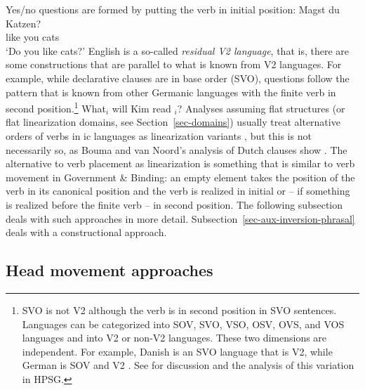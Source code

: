 \documentclass[output=paper
                ,modfonts
                ,nonflat
	        ,collection
	        ,collectionchapter
	        ,collectiontoclongg
 	        ,biblatex
                ,babelshorthands
                ,newtxmath
                ,draftmode
                ,colorlinks, citecolor=brown
]{./langsci/langscibook}
\begin{document}
Yes/no questions are formed by putting the verb in initial position:
\ea
\gll Magst du Katzen?\\
     like  you cats\\
\glt `Do you like cats?'
\z
English is a so-called \emph{residual V2 language}, that is, there are
some constructions that are parallel to what is known from V2 languages.
For example, while declarative clauses are in base order (SVO), questions follow the pattern that is
known from other Germanic languages with the finite verb in second position.\footnote{%
  SVO is not V2 although the verb is in second position in SVO sentences. Languages can be
  categorized into SOV, SVO, VSO, OSV, OVS, and VOS languages and into V2 or non-V2 languages. These two
  dimensions are independent. For example, Danish is an SVO language that is V2, while German is SOV
  and V2 \citep{Haider2019a}. See  for discussion and the analysis of this variation in HPSG.
}
\ea
What$_i$ will Kim read \trace$_i$? 
\z
Analyses assuming flat structures (or flat linearization domains, see Section~\ref{sec-domains})
usually treat alternative orders of verbs in ic languages as linearization variants
\citep{Reape94a,Kathol2001a,Mueller95c,Mueller2003a,TBjerre2006a}, but this is not necessarily so, as
Bouma and van Noord's analysis of Dutch clauses show \citep[, 71]{BvN98a}. The alternative to
verb placement as linearization is something that is similar to verb movement in Government \&
Binding: an empty element takes the position of the verb in its canonical position and the verb is realized
in initial or -- if something is realized before the finite verb -- in second position. The following subsection deals with such approaches in more
detail. Subsection~\ref{sec-aux-inversion-phrasal} deals with a constructional approach.

\subsection{Head movement approaches}
\label{sec-head-movement}
\end{document}
